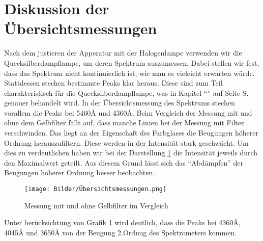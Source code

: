 \section{Diskussion der Übersichtsmessungen}

Nach dem justieren der Apperatur mit der Halogenlampe verwenden wir die Quecksilberdampflampe, um deren Spektrum auszumessen.
Dabei stellen wir fest, dass das Spektrum nicht kontinuierlich ist, wie man es vieleicht erwarten würde.
Stattdessen stechen bestimmte Peaks klar heraus. Diese sind zum Teil charakteristisch für die Quecksilberdampflampe, was in 
Kapitel "`"' auf Seite S.\pageref{Messlit} genauer behandelt wird.\newline
In der Übersichtsmessung des Spektrums stechen vorallem die Peaks bei 5460\r{A} und 4360\r{A}.
Beim Vergleich der Messung mit und ohne dem Gelbfilter fällt auf, dass manche Linien bei der Messung mit Filter verschwinden. Das liegt an der Eigenschaft des 
Farbglases die Beugungen höherer Ordnung herauszufiltern. Diese werden in der Intensität stark geschwächt. Um dies zu verdeutlichen haben wir bei der Darstellung \ref{Übersichtsmessungen}  die Intensität
jeweils durch den Maximalwert geteilt. Aus diesem Grund lässt sich das "`Abdämpfen"' der Beugungen höherer Ordnung besser  beobachten.

\begin{figure}[h]
    \centering
    \texttt{[image: Bilder/Übersichtsmessungen.png]}
    \caption{Messung mit und ohne Gelbfilter im Vergleich}
    \label{Übersichtsmessungen}
\end{figure}

Unter berücksichtung von Grafik \ref{Übersichtsmessungen} wird deutlich, dass die Peaks bei 4360\r{A}, 4045\r{A} und 3650\r{A} von der Beugung 2.Ordnug des Spektrometers kommen.


